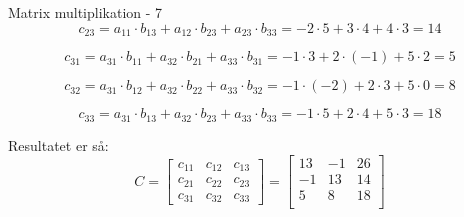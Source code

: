 \documentclass{article}
\begin{document}
\begin{exercise}{Matrix multiplikation - 7}
	\hint
	\[
		c_{23} = a_{11} \cdot b_{13} + a_{12} \cdot b_{23} + a_{23} \cdot b_{33} = -2 \cdot 5 + 3 \cdot 4 + 4 \cdot 3 = 14
	\]
	
	\hint
	\[
		c_{31} = a_{31} \cdot b_{11} + a_{32} \cdot b_{21} + a_{33} \cdot b_{31} = -1 \cdot 3 + 2 \cdot (-1) + 5 \cdot 2 = 5
	\]	
	
	\hint
	\[
		c_{32} = a_{31} \cdot b_{12} + a_{32} \cdot b_{22} + a_{33} \cdot b_{32} = -1 \cdot (-2) + 2 \cdot 3 + 5 \cdot 0 = 8
	\]
	
	\hint
	\[
		c_{33} = a_{31} \cdot b_{13} + a_{32} \cdot b_{23} + a_{33} \cdot b_{33} = -1 \cdot 5 + 2 \cdot 4 + 5 \cdot 3= 18
	\]	
	
	
	
	\hint
	Resultatet er så:
	\[
	C = \left[\begin{array}{rrr}
	c_{11} & c_{12} & c_{13} \\
	c_{21} & c_{22} & c_{23} \\
	c_{31} & c_{32} & c_{33}
	\end{array} \right] = 
	\left[\begin{array}{rrr}
	13 & -1 & 26 \\
	-1 & 13 & 14 \\
	5 & 8 & 18 \\
	\end{array} \right]
	\]
	
	
\end{exercise}

\newpage
\end{document}
